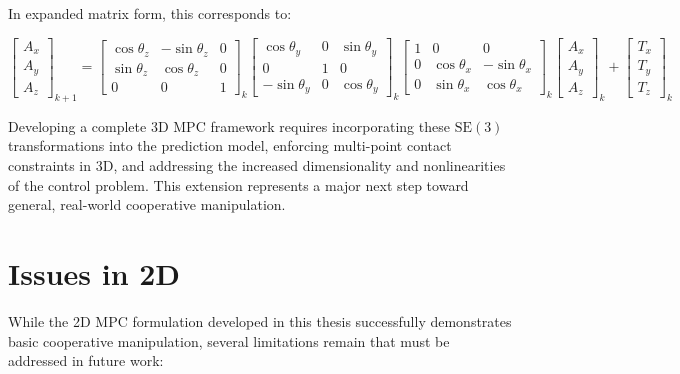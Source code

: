 \documentclass[12pt,english]{report}
\begin{document}
In expanded matrix form, this corresponds to:

\[
\begin{bmatrix}
    A_x\\
    A_y\\
    A_z
\end{bmatrix}_{k+1} = 
\begin{bmatrix}
    \cos \theta_z & -\sin \theta_z & 0 \\
    \sin \theta_z & \cos \theta_z & 0 \\
    0 & 0 & 1
\end{bmatrix}_k 
\begin{bmatrix}
    \cos \theta_y & 0  & \sin \theta_y \\
    0 & 1 & 0\\
    -\sin \theta_y & 0 & \cos \theta_y
\end{bmatrix}_k 
\begin{bmatrix}
    1 & 0 & 0 \\
    0 & \cos \theta_x & -\sin \theta_x\\
    0 & \sin \theta_x & \cos \theta_x
\end{bmatrix}_k 
\begin{bmatrix}
    A_x\\
    A_y\\
    A_z
\end{bmatrix}_k
+
\begin{bmatrix}
    T_x\\
    T_y\\
    T_z
\end{bmatrix}_k
\]

Developing a complete 3D MPC framework requires incorporating these $\mathrm{SE}(3)$ transformations into the prediction model, enforcing multi-point contact constraints in 3D, and addressing the increased dimensionality and nonlinearities of the control problem. This extension represents a major next step toward general, real-world cooperative manipulation.


\section{Issues in 2D}

While the 2D MPC formulation developed in this thesis successfully demonstrates basic cooperative manipulation, several limitations remain that must be addressed in future work:
\end{document}

